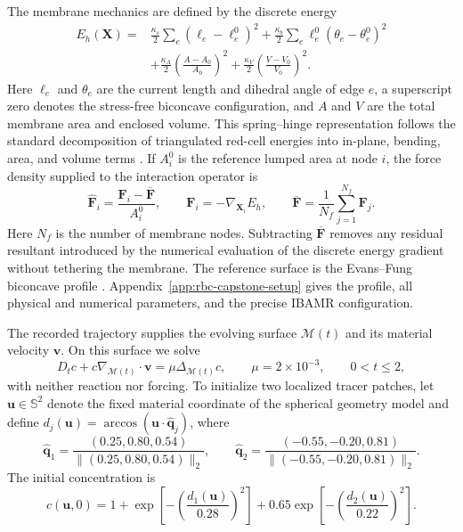 \documentclass[a4paper,fleqn]{cas-sc}
\begin{document}
The membrane mechanics are defined by the discrete energy
\begin{equation}
\begin{split}
  E_h(\bm X)
  ={}&\frac{\kappa_s}{2}\sum_{e}(\ell_e-\ell_e^0)^2
  +\frac{\kappa_b}{2}\sum_e \ell_e^0(\theta_e-\theta_e^0)^2 \\
  &+\frac{\kappa_A}{2}\left(\frac{A-A_0}{A_0}\right)^2
  +\frac{\kappa_V}{2}\left(\frac{V-V_0}{V_0}\right)^2.
  \label{eq:rbc-capstone-membrane-energy}
\end{split}
\end{equation}
Here \(\ell_e\) and \(\theta_e\) are the current length and dihedral angle of
edge \(e\), a superscript zero denotes the stress-free biconcave configuration,
and \(A\) and \(V\) are the total membrane area and enclosed volume.  This
spring--hinge representation follows the standard decomposition of
triangulated red-cell energies into in-plane, bending, area, and volume terms
\cite{FedosovCaswellKarniadakis2010RBC}.  If \(A_i^0\) is the reference lumped
area at node \(i\), the force density supplied to the interaction operator is
\begin{equation}
  \widehat{\bm F}_i
  =\frac{\bm F_i-\overline{\bm F}}{A_i^0},
  \qquad
  \bm F_i=-\nabla_{\bm X_i}E_h,
  \qquad
  \overline{\bm F}=\frac{1}{N_f}\sum_{j=1}^{N_f}\bm F_j.
  \label{eq:rbc-capstone-membrane-force}
\end{equation}
Here \(N_f\) is the number of membrane nodes.  Subtracting
\(\overline{\bm F}\) removes any residual resultant introduced by the numerical
evaluation of the discrete energy gradient without tethering the membrane.  The reference
surface is the Evans--Fung biconcave profile
\cite{EvansFung1972ErythrocyteGeometry}.  Appendix~\ref{app:rbc-capstone-setup}
gives the profile, all physical and numerical parameters, and the precise
IBAMR configuration.

The recorded trajectory supplies the evolving surface \(\mathcal M(t)\) and
its material velocity \(\bm v\).  On this surface we solve
\begin{equation}
  D_t c+c\nabla_{\mathcal M(t)}\!\cdot\bm v
  =\mu\Delta_{\mathcal M(t)}c,
  \qquad
  \mu=2\times10^{-3},
  \qquad 0<t\le2,
  \label{eq:rbc-capstone-pde}
\end{equation}
with neither reaction nor forcing.  To initialize two localized tracer
patches, let \(\bm u\in\mathbb S^2\) denote the fixed material coordinate of
the spherical geometry model and define
\(d_j(\bm u)=\arccos(\bm u\cdot\widehat{\bm q}_j)\), where
\begin{equation}
  \widehat{\bm q}_1
  =\frac{(0.25,0.80,0.54)}{\lVert(0.25,0.80,0.54)\rVert_2},
  \qquad
  \widehat{\bm q}_2
  =\frac{(-0.55,-0.20,0.81)}{\lVert(-0.55,-0.20,0.81)\rVert_2}.
\end{equation}
The initial concentration is
\begin{equation}
  c(\bm u,0)
  =1+\exp\!\left[-\left(\frac{d_1(\bm u)}{0.28}\right)^2\right]
  +0.65\exp\!\left[-\left(\frac{d_2(\bm u)}{0.22}\right)^2\right].
  \label{eq:rbc-capstone-initial}
\end{equation}
\end{document}
